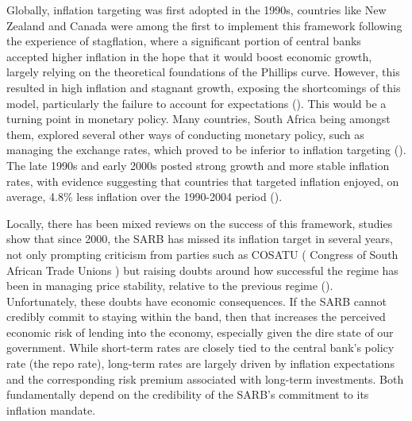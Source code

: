 \documentclass[11pt,preprint]{elsarticle}
\numberwithin{equation}{section}
\numberwithin{figure}{section}
\numberwithin{table}{section}
\begin{document}
Globally, inflation targeting was first adopted in the 1990s, countries
like New Zealand and Canada were among the first to implement this
framework following the experience of stagflation, where a significant
portion of central banks accepted higher inflation in the hope that it
would boost economic growth, largely relying on the theoretical
foundations of the Phillips curve. However, this resulted in high
inflation and stagnant growth, exposing the shortcomings of this model,
particularly the failure to account for expectations
(). This would be a
turning point in monetary policy. Many countries, South Africa being
amongst them, explored several other ways of conducting monetary policy,
such as managing the exchange rates, which proved to be inferior to
inflation targeting (). The late 1990s and early 2000s posted strong growth
and more stable inflation rates, with evidence suggesting that countries
that targeted inflation enjoyed, on average, 4.8\% less inflation over
the 1990-2004 period ().

Locally, there has been mixed reviews on the success of this framework,
studies show that since 2000, the SARB has missed its inflation target
in several years, not only prompting criticism from parties such as
COSATU ( Congress of South African Trade Unions ) but raising doubts
around how successful the regime has been in managing price stability,
relative to the previous regime (). Unfortunately, these doubts have economic consequences.
If the SARB cannot credibly commit to staying within the band, then that
increases the perceived economic risk of lending into the economy,
especially given the dire state of our government. While short-term
rates are closely tied to the central bank's policy rate (the repo
rate), long-term rates are largely driven by inflation expectations and
the corresponding risk premium associated with long-term investments.
Both fundamentally depend on the credibility of the SARB's commitment to
its inflation mandate.
\end{document}
